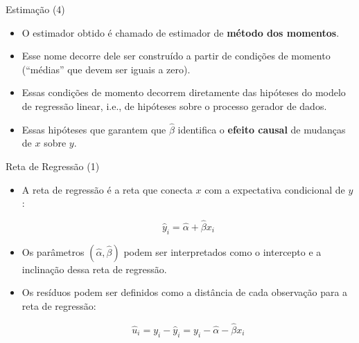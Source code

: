 \documentclass[10pt,slides,xcolor=pdftex,dvipsnames,table]{beamer}
\begin{document}

\begin{frame}{Estimação (4)}

    \begin{itemize}\itemsep1.2em
    
     \item O estimador obtido é chamado de estimador de \textbf{método dos momentos}.
     
     \item Esse nome decorre dele ser construído a partir de condições de momento (``médias'' que devem ser iguais a zero).
     
     \item Essas condições de momento decorrem diretamente das hipóteses do modelo de regressão linear, i.e., de hipóteses sobre o processo gerador de dados. 
     
     \item Essas hipóteses que garantem que $\hat{\beta}$ identifica o \textbf{efeito causal} de mudanças de $x$ sobre $y$. 
     
     \end{itemize}
    
\end{frame}


\begin{frame}{Reta de Regressão (1)}

    \begin{itemize}\itemsep1.2em
    
     \item A reta de regressão é a reta que conecta $x$ com a expectativa condicional de $y$:
     
     $$ \hat{y}_i = \hat{\alpha} + \hat{\beta} x_i $$
     
     \item Os parâmetros $(\hat{\alpha},\hat{\beta})$ podem ser interpretados como o intercepto e a inclinação dessa reta de regressão. 
     
     \item Os resíduos podem ser definidos como a distância de cada observação para a reta de regressão:
     
     $$ \hat{u}_i = y_i - \hat{y}_i = y_i - \hat{\alpha} - \hat{\beta} x_i $$ 
     
     \end{itemize}
    
\end{frame}
\end{document}
